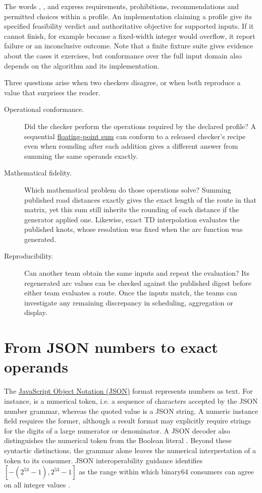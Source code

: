 The words \must{}, \mustnot{}, \should{} and \may{} express requirements, prohibitions, recommendations and permitted choices within a profile. An implementation claiming a profile \must{} give its specified feasibility verdict and authoritative objective for supported inputs. If it cannot finish, for example because a fixed-width integer would overflow, it \must{} report failure or an inconclusive outcome. Note that a finite fixture suite gives evidence about the cases it exercises, but conformance over the full input domain also depends on the algorithm and its implementation.

Three questions arise when two checkers disagree, or when both reproduce a value that surprises the reader.
\begin{description}
\item[Operational conformance.] Did the checker perform the operations required by the declared profile? A sequential \href{https://en.wikipedia.org/wiki/Floating-point_arithmetic}{floating-point sum} can conform to a released checker's recipe even when rounding after each addition gives a different answer from summing the same operands exactly.
\item[Mathematical fidelity.] Which mathematical problem do those operations solve? Summing published road distances exactly gives the exact length of the route in that matrix, yet this sum still inherits the rounding of each distance if the generator applied one. Likewise, exact TD interpolation evaluates the published knots, whose resolution was fixed when the arc function was generated.
\item[Reproducibility.] Can another team obtain the same inputs and repeat the evaluation? Its regenerated arc values can be checked against the published digest before either team evaluates a route. Once the inputs match, the teams can investigate any remaining discrepancy in scheduling, aggregation or display.
\end{description}

\section{From JSON numbers to exact operands}\label{sec:binary64}

The \href{https://en.wikipedia.org/wiki/JSON}{JavaScript Object Notation (JSON)} format represents numbers as text. For instance,  is a numerical token, i.e. a sequence of characters accepted by the JSON number grammar, whereas the quoted value  is a JSON string. A numeric instance field requires the former, although a result format may explicitly require strings for the digits of a large numerator or denominator. A JSON decoder also distinguishes the numerical token  from the Boolean literal . Beyond these syntactic distinctions, the grammar alone leaves the numerical interpretation of a token to its consumer. JSON interoperability guidance identifies $[-(2^{53}-1),2^{53}-1]$ as the range within which binary64 consumers can agree on all integer values \autocite{brayJSON2017}.

